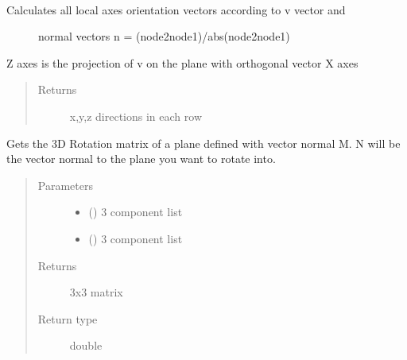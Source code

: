 \documentclass[letterpaper,10pt,english]{sphinxmanual}
\begin{document}
\begin{fulllineitems}
\label{\detokenize{api:beamon.core.get_local_orientation}}~\begin{description}
\item[{Calculates all local axes orientation vectors according to v vector and}] \leavevmode
normal vectors n = (node2\sphinxhyphen{}node1)/abs(node2\sphinxhyphen{}node1)

\end{description}

Z axes is the projection of v on the plane with orthogonal vector X axes
\begin{quote}\begin{description}
\item[{Returns}] \leavevmode
x,y,z directions in each row

\end{description}\end{quote}

\end{fulllineitems}


\begin{fulllineitems}
\label{\detokenize{api:beamon.core.get_rmat}}
Gets the 3D Rotation matrix of a plane defined with vector normal M.
N will be the vector normal to the plane you want to rotate into.
\begin{quote}\begin{description}
\item[{Parameters}] \leavevmode\begin{itemize}
\item {} 
 () \textendash{} 3 component list

\item {} 
 () \textendash{} 3 component list

\end{itemize}

\item[{Returns}] \leavevmode
3x3 matrix

\item[{Return type}] \leavevmode
double

\end{description}\end{quote}

\end{fulllineitems}
\end{document}
